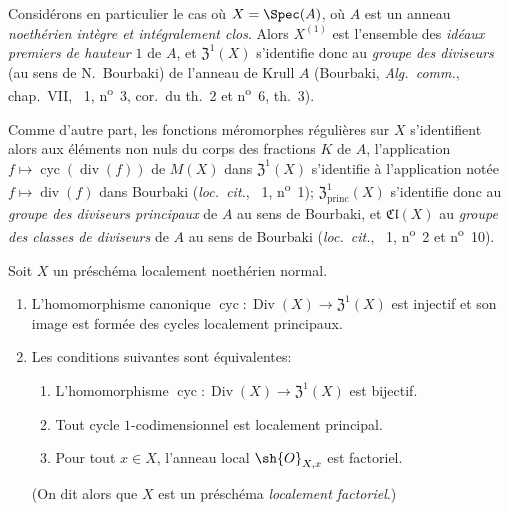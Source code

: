 \begin{env}[21.6.8]
\label{IV.21.6.8}
Considérons en particulier le cas où $X=\Spec(A)$, où $A$ est un anneau \emph{noethérien intègre et intégralement clos}.
Alors $X^{(1)}$ est l'ensemble des \emph{idéaux premiers de hauteur $1$} de $A$, et $\mathfrak{Z}^1(X)$ s'identifie donc au \emph{groupe des diviseurs} (au sens de N.~Bourbaki) de l'anneau de Krull $A$ (Bourbaki, \emph{Alg.\ comm.}, chap.~VII, \textsection~1, n\textsuperscript{o}~3, cor.\ du th.~2 et n\textsuperscript{o}~6, th.~3).

Comme d'autre part, les fonctions méromorphes régulières sur $X$ s'identifient alors aux éléments non nuls du corps des fractions $K$ de $A$, l'application $f\mapsto\operatorname{cyc}(\operatorname{div}(f))$ de $M(X)$ dans $\mathfrak{Z}^1(X)$ s'identifie à l'application notée $f\mapsto\operatorname{div}(f)$ dans Bourbaki (\emph{loc.\ cit.}, \textsection~1, n\textsuperscript{o}~1);
$\mathfrak{Z}^1_\mathrm{princ}(X)$ s'identifie donc au \emph{groupe des diviseurs principaux} de $A$ au sens de Bourbaki, et $\mathfrak{Cl}(X)$ au \emph{groupe des classes de diviseurs} de $A$ au sens de Bourbaki (\emph{loc.\ cit.}, \textsection~1, n\textsuperscript{o}~2 et n\textsuperscript{o}~10).
\end{env}

\begin{theorem}[21.6.9]
Soit $X$ un préschéma localement noethérien normal.
\begin{enumerate}[label=(\roman*)]
  \item L'homomorphisme canonique $\operatorname{cyc}:\operatorname{Div}(X)\to\mathfrak{Z}^1(X)$ est injectif et son image est formée des cycles localement principaux.
  \item Les conditions suivantes sont équivalentes:
  \begin{enumerate}[label=\emph{\alph*)}]
    \item L'homomorphisme $\operatorname{cyc}:\operatorname{Div}(X)\to\mathfrak{Z}^1(X)$ est bijectif.
    \item Tout cycle $1$-codimensionnel est localement principal.
    \item Pour tout $x\in X$, l'anneau local $\sh{O}_{X,x}$ est factoriel.
  \end{enumerate}
  (On dit alors que $X$ est un préschéma \emph{localement factoriel}.)
\end{enumerate}
\end{theorem}

